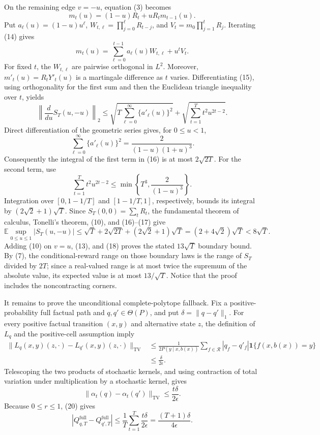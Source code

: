On the remaining edge \(v=-u\), equation (3) becomes
\[
 m_t(u)=(1-u)R_t+uR_tm_{t-1}(u).
 \tag{14}
\]
Put \(a_\ell(u)=(1-u)u^\ell\),
\(W_{t,\ell}=\prod_{j=0}^{\ell}R_{t-j}\), and
\(V_t=m_0\prod_{j=1}^tR_j\).  Iterating (14) gives
\[
 m_t(u)=\sum_{\ell=0}^{t-1}a_\ell(u)W_{t,\ell}+u^tV_t.
 \tag{15}
\]
For fixed \(t\), the \(W_{t,\ell}\) are pairwise orthogonal in \(L^2\).  Moreover, \(m'_t(u)=R_tY'_t(u)\) is a martingale difference as \(t\) varies.  Differentiating (15), using orthogonality for the first sum and then the Euclidean triangle inequality over \(t\), yields
\[
 \left\|\frac{d}{du}S_T(u,-u)\right\|_2
 \leq
 \sqrt{T\sum_{\ell=0}^{\infty}\{a'_\ell(u)\}^2}
 +\sqrt{\sum_{t=1}^Tt^2u^{2t-2}}.
 \tag{16}
\]
Direct differentiation of the geometric series gives, for \(0\leq u<1\),
\[
 \sum_{\ell=0}^{\infty}\{a'_\ell(u)\}^2
 =\frac{2}{(1-u)(1+u)^3}.
 \tag{17}
\]
Consequently the integral of the first term in (16) is at most \(2\sqrt{2T}\).  For the second term, use
\[
 \sum_{t=1}^Tt^2u^{2t-2}
 \leq\min\left\{T^3,\frac{2}{(1-u)^3}\right\}.
\]
Integration over \([0,1-1/T]\) and \([1-1/T,1]\), respectively, bounds its integral by \((2\sqrt2+1)\sqrt T\).  Since \(S_T(0,0)=\sum_tR_t\), the fundamental theorem of calculus, Tonelli's theorem, (10), and (16)--(17) give
\[
 \mathbb E\sup_{0\leq u\leq1}|S_T(u,-u)|
 \leq\sqrt T+2\sqrt{2T}+(2\sqrt2+1)\sqrt T
 =(2+4\sqrt2)\sqrt T<8\sqrt T.
 \tag{18}
\]
Adding (10) on \(v=u\), (13), and (18) proves the stated \(13\sqrt T\) boundary bound.  By (7), the conditional-reward range on those boundary laws is the range of \(S_T\) divided by \(2T\); since a real-valued range is at most twice the supremum of the absolute value, its expected value is at most \(13/\sqrt T\).  Notice that the proof includes the noncontracting corners.

It remains to prove the unconditional complete-polytope fallback.  Fix a positive-probability full factual path and \(q,q'\in\Theta(P)\), and put \(\delta=\lVert q-q'\rVert_1\).  For every positive factual transition \((x,y)\) and alternative state \(z\), the definition of \(L_q\) and the positive-cell assumption imply
\[
 \begin{aligned}
 \bigl\|L_q(x,y)(z,\cdot)-L_{q'}(x,y)(z,\cdot)\bigr\|_{\mathrm{TV}}
 &\leq\frac1{2P(y\mid x,b(x))}
 \sum_{f\in\mathcal R}|q_f-q'_f|\mathbf 1\{f(x,b(x))=y\}\\
 &\leq\frac{\delta}{2\epsilon}.
 \end{aligned}
 \tag{19}
\]
Telescoping the two products of stochastic kernels, and using contraction of total variation under multiplication by a stochastic kernel, gives
\[
 \lVert\alpha_t(q)-\alpha_t(q')\rVert_{\mathrm{TV}}
 \leq\frac{t\delta}{2\epsilon}.
 \tag{20}
\]
Because \(0\leq r\leq1\), (20) gives
\[
 \left|Q^{\mathrm{full}}_{q,T}-Q^{\mathrm{full}}_{q',T}\right|
 \leq\frac1T\sum_{t=1}^T\frac{t\delta}{2\epsilon}
 =\frac{(T+1)\delta}{4\epsilon}.
 \tag{21}
\]

